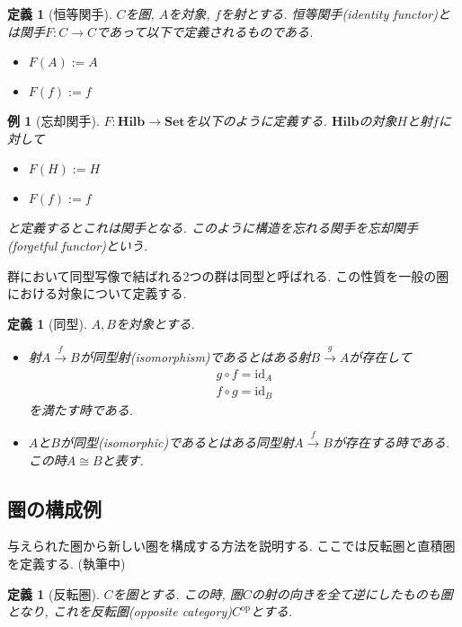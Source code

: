 \documentclass[a4paper,12pt]{ltjsarticle}
\theoremstyle{break}
\newtheorem{defn}[thm]{定義}
\newtheorem{eg}[thm]{例}
\newcommand{\cset}{\mathbf{Set}}
\newcommand{\hilb}{\mathbf{Hilb}}
\newcommand{\Op}{\mathrm{op}}
\newcommand{\xr}[1]{\xrightarrow{#1}}
\newcommand{\id}{\mathrm{id}}
\newcommand{\ci}{\circ}
\numberwithin{equation}{section}
\begin{document}
\begin{defn}[恒等関手]
  $C$を圏, $A$を対象, $f$を射とする. 
  恒等関手(identity functor)とは関手$F :C \to C$であって以下で定義されるものである. 
  \begin{itemize}
    \item $F(A):=A$
    \item $F(f):=f$
  \end{itemize}
\end{defn}

\begin{eg}[忘却関手]
  $F: \hilb \to \cset$を以下のように定義する. 
  $\hilb$の対象$H$と射$f$に対して
  \begin{itemize}
    \item $F(H):=H$
    \item $F(f):=f$
  \end{itemize}
  と定義するとこれは関手となる. 
  このように構造を忘れる関手を忘却関手(forgetful functor)という. 
\end{eg}

群において同型写像で結ばれる2つの群は同型と呼ばれる.
この性質を一般の圏における対象について定義する. 

\begin{defn}[同型]
  $A,B$を対象とする. 
  \begin{itemize}
    \item 射$A \xr{f} B$が同型射(isomorphism)であるとはある射$B \xr{g} A$が存在して
    \begin{align*}
      g \ci f = \id_A \\
      f \ci g = \id_B
    \end{align*}
    を満たす時である. 
    \item $A$と$B$が同型(isomorphic)であるとはある同型射$A \xr{f} B$が存在する時である. 
    この時$A \cong B$と表す. 
  \end{itemize}
\end{defn}

\subsection{圏の構成例}

与えられた圏から新しい圏を構成する方法を説明する. 
ここでは反転圏と直積圏を定義する. (執筆中)

\begin{defn}[反転圏]
  $C$を圏とする. 
  この時, 圏$C$の射の向きを全て逆にしたものも圏となり, 
  これを反転圏(opposite category)$C^\Op$とする. 
\end{defn}
\end{document}
